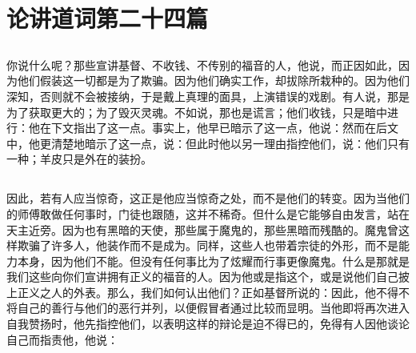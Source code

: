 

\section{论讲道词第二十四篇}


\subsection{}

\par

你说什么呢？那些宣讲基督、不收钱、不传别的福音的人，他说，而正因如此，因为他们假装这一切都是为了欺骗。因为他们确实工作，却拔除所栽种的。因为他们深知，否则就不会被接纳，于是戴上真理的面具，上演错误的戏剧。有人说，那是为了获取更大的；为了毁灭灵魂。不如说，那也是谎言；他们收钱，只是暗中进行：他在下文指出了这一点。事实上，他早已暗示了这一点，他说：然而在后文中，他更清楚地暗示了这一点，说：但此时他以另一理由指控他们，说：他们只有一种；羊皮只是外在的装扮。\par


\subsection{}

\par

因此，若有人应当惊奇，这正是他应当惊奇之处，而不是他们的转变。因为当他们的师傅敢做任何事时，门徒也跟随，这并不稀奇。但什么是它能够自由发言，站在天主近旁。因为也有黑暗的天使，那些属于魔鬼的，那些黑暗而残酷的。魔鬼曾这样欺骗了许多人，他装作而不是成为。同样，这些人也带着宗徒的外形，而不是能力本身，因为他们不能。但没有任何事比为了炫耀而行事更像魔鬼。什么是那就是我们这些向你们宣讲拥有正义的福音的人。因为他或是指这个，或是说他们自己披上正义之人的外表。那么，我们如何认出他们？正如基督所说的：因此，他不得不将自己的善行与他们的恶行并列，以便假冒者通过比较而显明。当他即将再次进入自我赞扬时，他先指控他们，以表明这样的辩论是迫不得已的，免得有人因他谈论自己而指责他，他说：\par

